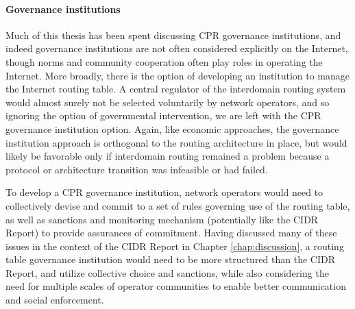 %
%
%
%

\paragraph{Governance institutions}

Much of this thesis has been spent discussing CPR governance institutions, and
indeed governance institutions are not often considered explicitly on the
Internet, though norms and community cooperation often play roles in operating
the Internet. More broadly, there is the option of developing an institution to
manage the Internet routing table. A central regulator of the interdomain
routing system would almost surely not be selected voluntarily by network
operators, and so ignoring the option of governmental intervention, we are left
with the CPR governance institution option. Again, like economic approaches,
the governance institution approach is orthogonal to the routing architecture
in place, but would likely be favorable only if interdomain routing remained a
problem because a protocol or architecture transition was infeasible or had
failed.

To develop a CPR governance institution, network operators would need to
collectively devise and commit to a set of rules governing use of the routing
table, as well as sanctions and monitoring mechanism (potentially like the
CIDR Report) to provide assurances of commitment. Having discussed many of
these issues in the context of the CIDR Report in Chapter
\ref{chap:discussion}, a routing table governance institution would need to be
more structured than the CIDR Report, and utilize collective choice and
sanctions, while also considering the need for multiple scales of operator
communities to enable better communication and social enforcement.

